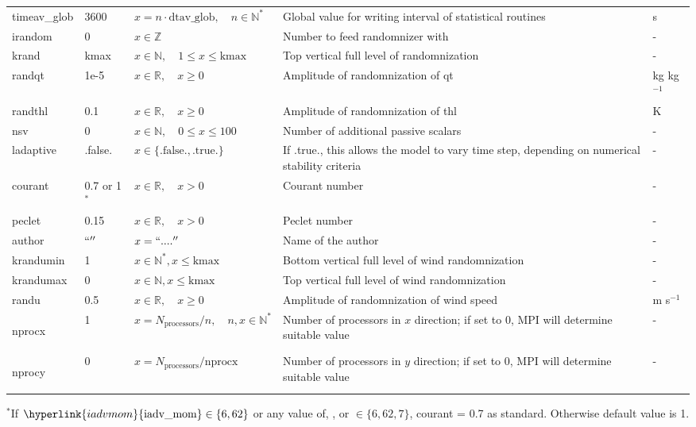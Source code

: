 \documentclass[twoside,11pt,fleqn,a4paper,english,openright]{report}
\begin{document}
\begin{center}
\begin{supertabular}{|l|p{1.6cm}|p{4.4cm}|p{6cm}|l|}
  timeav\_glob	& 3600		& $x = n \cdot \text{dtav\_glob}, \quad n \in \mathbb{N}^*$	& Global value for writing interval of statistical routines	& s\\
  irandom	& 0		& $x \in \mathbb{Z}$			& Number to feed randomnizer with		& -\\
  krand		& kmax		& $x \in \mathbb{N}, \quad 1 \leq x \leq \text{kmax}$		& Top vertical full level of randomnization 	& -\\
  randqt	& 1e-5		& $x \in \mathbb{R}, \quad x\geq 0$		& Amplitude of randomnization of qt		& kg kg$^{-1}$\\
  randthl	& 0.1		& $x \in \mathbb{R}, \quad x \geq 0$		& Amplitude of randomnization of thl		& K\\
  nsv		& 0		& $x \in \mathbb{N}, \quad 0 \leq x \leq 100$	& Number of additional passive scalars		& -\\
  ladaptive	& .false.	& $x\in\{\text{.false.},\text{.true.}\}$		& If .true., this allows the model to vary time step, depending on numerical stability criteria				& -\\
  courant	& 0.7 or 1$^*$	& $x \in \mathbb{R}, \quad x>0$		& Courant number				& -\\
  peclet	& 0.15 & $x \in \mathbb{R}, \quad x>0$		& Peclet number					& -\\	
  author	& $``''$	& $x = ``....''$	& Name of the author & -\\
  krandumin	& 1		& $x \in \mathbb{N}^*, x \leq \text{kmax}$	& Bottom vertical full level of wind randomnization 	& -\\
  krandumax	& 0		& $x \in \mathbb{N},  x \leq \text{kmax}$	& Top vertical full level of wind randomnization 	& -\\
  randu		& 0.5		& $x \in \mathbb{R}, \quad x \geq 0$		& Amplitude of randomnization of wind speed 	& m s$^{-1}$\\
  \hypertarget{nprocx}{nprocx}	& 1	& $x = N_{\text{processors}} / n, \quad n,x \in \mathbb{N}^*$	& Number of processors in $x$ direction; if set to 0, MPI will determine suitable value	& - \\
  \hypertarget{nprocy}{nprocy}	& 0	& $x = N_{\text{processors}} / \text{nprocx}$	& Number of processors in $y$ direction; if set to 0, MPI will determine suitable value	& - \\
\end{supertabular}
$^*$If $\hyperlink{iadvmom}{\text{iadv\_mom}} \in \lbrace6, 62\rbrace$ or any value of\hyperlink{iadvtke}{}, \hyperlink{iadvthl}{}, \hyperlink{iadvqt}{} or \hyperlink{iadvsv}{} $\in \lbrace6, 62, 7\rbrace$, courant = 0.7 as standard. Otherwise default value is 1.
\end{center}
\end{document}
